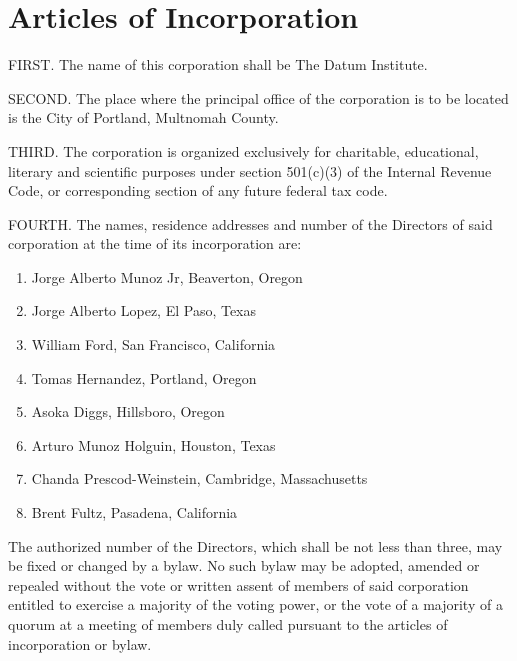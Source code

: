 \section{Articles of Incorporation}

FIRST. The name of this corporation shall be The Datum Institute.

SECOND. The place where the principal office of the corporation is to be located is the City of Portland, Multnomah County.

THIRD. The corporation is organized exclusively for charitable, educational, literary and scientific purposes under section 501(c)(3) of the Internal Revenue Code, or corresponding section of any future federal tax code. 

FOURTH. The names, residence addresses and number of the Directors of said corporation at the time of its incorporation are:

\begin{enumerate}
\item Jorge Alberto Munoz Jr, Beaverton, Oregon
\item Jorge Alberto Lopez, El Paso, Texas
\item William Ford, San Francisco, California
\item Tomas Hernandez, Portland, Oregon
\item Asoka Diggs, Hillsboro, Oregon
\item Arturo Munoz Holguin, Houston, Texas
\item Chanda Prescod-Weinstein, Cambridge, Massachusetts
\item Brent Fultz, Pasadena, California

\end{enumerate}

The authorized number of the Directors, which shall be not less than three, may be fixed or changed by a bylaw.  No such bylaw may be adopted, amended or repealed without the vote or written assent of members of said corporation entitled to exercise a majority of the voting power, or the vote of a majority of a quorum at a meeting of members duly called pursuant to the articles of incorporation or bylaw.


